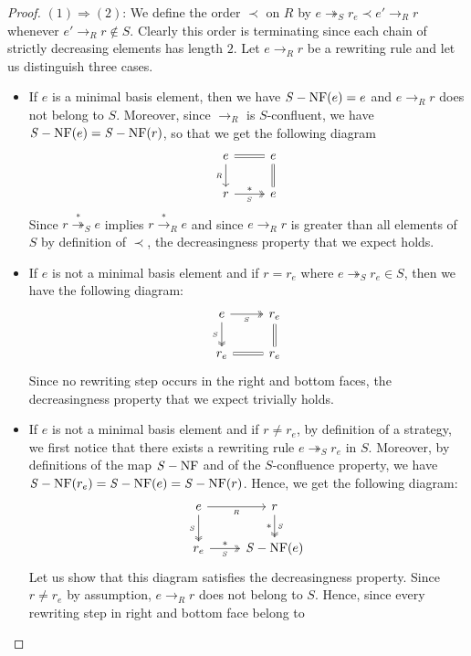 \documentclass[10pt]{easychair}
\theoremstyle{definition}
\newcommand\rewR{\to_R}
\newcommand\rewS{\twoheadrightarrow_S}
\newcommand\transR{\overset{*}{\to}_R}
\newcommand\transS{\overset{*}{\twoheadrightarrow}_S}
\DeclareMathOperator{\SNF}{{\it S}-NF}
\begin{document}
\begin{proof}
  $(1)\Rightarrow (2)$: We define the order $\prec$ on $R$ by
  $e\rewS r_e\prec e'\rewR r$ whenever $e'\rewR r\notin S$. Clearly this
  order is terminating since each chain of strictly decreasing elements
  has length $2$. Let $e\rewR r$ be a rewriting rule and let us
  distinguish three cases.
  \begin{itemize}
  \item If $e$ is a minimal basis element, then we have $\SNF(e)=e$ and
    $e\rewR r$ does not belong to $S$. Moreover, since $\rewR$ is
    $S$-confluent, we have $\SNF(e)=\SNF(r)$, so that we get the
    following diagram
    \[\begin{tikzcd}
    e\ar[d, "_R"']\ar[r, equal] &
    e\ar[d, equal]\\
    r\ar[r, twoheadrightarrow, "*", "_S"'] & e
    \end{tikzcd}\]
    Since $r\transS e$ implies $r\transR e$ and since $e\rewR r$ is greater
    than all elements of $S$ by definition of $\prec$, the decreasingness
    property that we expect holds.
  \item If $e$ is not a minimal basis element and if $r=r_e$ where
    $e\rewS r_e\in S$, then we have the following diagram:
    \[\begin{tikzcd}
    e\ar[r, twoheadrightarrow, "_S"']\ar[d, twoheadrightarrow, "_S"']
    & r_e \ar[equal, d]\\
    r_e\ar[r, equal] & r_e
    \end{tikzcd}\]
    Since no rewriting step occurs in the right and bottom faces, the
    decreasingness property that we expect trivially holds.
  \item If $e$ is not a minimal basis element and if $r\neq r_e$, by
    definition of a strategy, we first notice that there exists a
    rewriting rule $e\rewS r_e$ in $S$. Moreover, by definitions of the
    map $\SNF$ and of the $S$-confluence property, we have
    $\SNF(r_e)=\SNF(e)=\SNF(r)$. Hence, we get the following diagram:
    \[\begin{tikzcd}
    e\ar[r, "_R"']\ar[d, twoheadrightarrow, "_S"'] &
    r \ar[twoheadrightarrow, , "_S", "*"', d] \\
    r_e\ar[r, twoheadrightarrow, "_S"', "*"] & \SNF (e)
    \end{tikzcd}\]
    Let us show that this diagram satisfies the decreasingness property.
    Since $r\neq r_e$ by assumption, $e\rewR r$ does not belong to $S$.
    Hence, since every rewriting step in right and bottom face belong to

\end{itemize}
\end{proof}
\end{document}
